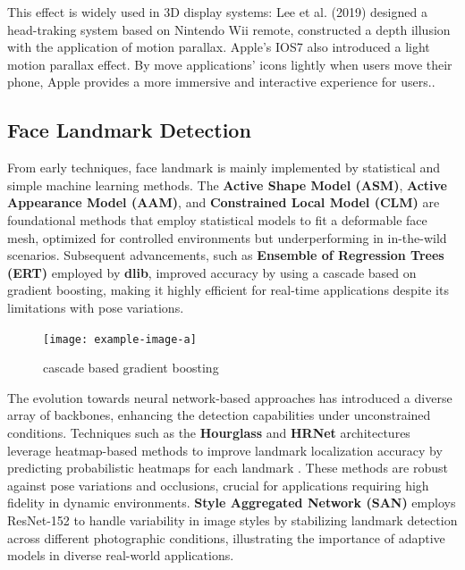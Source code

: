 This effect is widely used in 3D display systems: Lee et al. (2019) designed a head-traking system based on Nintendo Wii remote, constructed a depth illusion with the application of motion parallax\cite{Lee}. Apple's IOS7 also introduced a light motion parallax effect. By move applications' icons lightly when users move their phone, Apple provides a more immersive and interactive experience for users.\cite{Apple2014}.
\subsection{Face  Landmark Detection}
From early techniques, face landmark is mainly implemented by statistical and simple machine learning methods. The \textbf{Active Shape Model (ASM)}, \textbf{Active Appearance Model (AAM)}, and \textbf{Constrained Local Model (CLM)} \cite{WANG201850} \cite{Khabarlak_2022} are foundational methods that employ statistical models to fit a deformable face mesh, optimized for controlled environments but underperforming in in-the-wild scenarios. Subsequent advancements, such as \textbf{Ensemble of Regression Trees (ERT)} \cite{Kazemi_2014_CVPR} employed by \textbf{dlib}, improved accuracy by using a cascade based on gradient boosting, making it highly efficient for real-time applications despite its limitations with pose variations.

\begin{figure}[htb]
    \centering
    \texttt{[image: example-image-a]}
    \caption{cascade based gradient boosting }\label{F:test-a}
\end{figure}

The evolution towards neural network-based approaches has introduced a diverse array of backbones, enhancing the detection capabilities under unconstrained conditions. Techniques such as the \textbf{Hourglass} \cite{Newell_2016_ECCV} and \textbf{HRNet} \cite{Sun_2019_CVPR} architectures leverage heatmap-based methods to improve landmark localization accuracy by predicting probabilistic heatmaps for each landmark . These methods are robust against pose variations and occlusions, crucial for applications requiring high fidelity in dynamic environments.
\textbf{Style Aggregated Network (SAN)}\cite{Dong_2018_CVPR} employs ResNet-152 \cite{He_2016_CVPR} to handle variability in image styles by stabilizing landmark detection across different photographic conditions, illustrating the importance of adaptive models in diverse real-world applications.

